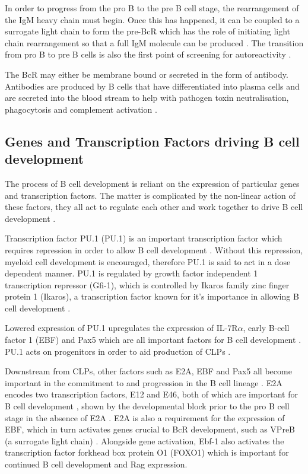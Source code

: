 In order to progress from the pro B to the pre B cell stage, the rearrangement of the IgM heavy chain must begin.
Once this has happened, it can be coupled to a surrogate light chain to form the pre-BcR which has the role of initiating light chain rearrangement so that a full IgM molecule can be produced \citep{Burrows2002}.
The transition from pro B to pre B cells is also the first point of screening for autoreactivity \citep{Pieper2013}.

The BcR may either be membrane bound or secreted in the form of antibody.
Antibodies are produced by B cells that have differentiated into plasma cells and are secreted into the blood stream to help with pathogen toxin neutralisation, phagocytosis and complement activation \citep{Janeway2008}.


\subsection{Genes and Transcription Factors driving B cell development}
\label{subsec:Bcellgenes}

The process of B cell development is reliant on the expression of particular genes and transcription factors.
The matter is complicated by the non-linear action of these factors, they all act to regulate each other and work together to drive B cell development \citep{Mandel2010}.

Transcription factor PU.1 (PU.1) is an important transcription factor which requires repression in order to allow B cell development \citep{Dekoter2000}. 
Without this repression, myeloid cell development is encouraged, therefore PU.1 is said to act in a dose dependent manner.
PU.1 is regulated by growth factor independent 1 transcription repressor (Gfi-1), which is controlled by Ikaros family zinc finger protein 1 (Ikaros), a transcription factor known for it's importance in allowing B cell development \citep{Yoshida2006, Busslinger2004}. 

Lowered expression of PU.1 upregulates the expression of IL-7R$\alpha$, early B-cell factor 1 (EBF) and Pax5 which are all important factors for B cell development \citep{Hagman2006}.
PU.1 acts on progenitors in order to aid production of CLPs \citep{Hagman2006}.

Downstream from CLPs, other factors such as E2A, EBF and Pax5 all become important in the commitment to and progression in the B cell lineage \citep{Mansson2008}.
E2A encodes two transcription factors, E12 and E46, both of which are important for B cell development \citep{Bain1997}, shown by the developmental block prior to the pro B cell stage in the absence of E2A \citep{Bain1994}.
E2A is also a requirement for the expression of EBF, which in turn activates genes crucial to BcR development, such as VPreB (a surrogate light chain) \citep{Welinder2011}.
Alongside gene activation, Ebf-1 also activates the transcription factor forkhead box protein O1 (FOXO1) which is important for continued B cell development and Rag expression\citep{Amin2008}.

